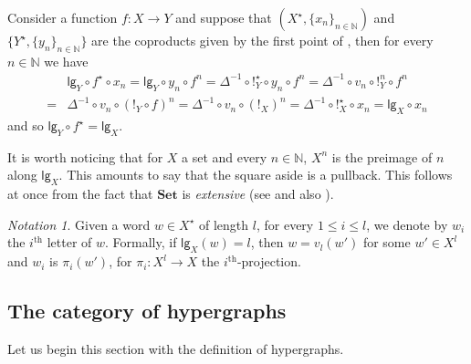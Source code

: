 \documentclass[3p]{elsarticle}
\newcommand{\lgh}{\mathsf{lg}}
\newcommand{\Set}{\mathbf{Set}}
\theoremstyle{remark}
\newtheorem*{notaz}{Notation}
\theoremstyle{definition}
\begin{document}
\begin{rem}\label{rem:le} Consider a function $f\colon X\to Y$  and suppose that $(X^\star, \{x_n\}_{n\in \mathbb{N}})$ and $\{Y^\star, \{y_n\}_{n\in \mathbb{N}}\}$ are the coproducts given by the first point of , then for every $n\in \mathbb{N}$ we have 
	\begin{align*}
&\lgh_{Y}\circ f^\star \circ x_n = \lgh_{Y}\circ y_n \circ f^n= \Delta^{-1}\circ !^\star_{Y} \circ y_n\circ f^n =  \Delta^{-1}\circ v_n \circ !^n_{Y} \circ f^n \\=& \Delta^{-1}\circ v_n \circ (!_{Y} \circ f)^n  = \Delta^{-1}\circ v_n \circ (!_{X})^n = \Delta^{-1}\circ !^\star_{X} \circ x_n = \lgh_{X}\circ x_n
	\end{align*}
and so $\lgh_{Y}\circ f^\star= \lgh_{X}$.
\end{rem}

\noindent
\begin{minipage}[r]{.83\linewidth}
	\begin{rem}\label{rem:len} It is worth noticing that for $X$ a set and every $n\in \mathbb{N}$, $X^n$ is the preimage of $n$ along $\lgh_{X}$. This amounts to say that the square aside is a pullback. This follows at once from the fact that $\Set$ is \emph{extensive} (see \cite{carboni1993introduction} and also ). 
	\end{rem}
\end{minipage}\hfill \begin{minipage}[l]{.15\linewidth} \vspace{-.2cm}
\xymatrix@R=13pt{X^n \ar@{>->}[r]^{v_n} \ar[d]^{!_{X^n}}& X^\star  \ar[d]^{\lgh_{X}}\\ 1 \ar@{>->}[r]^{\delta_n} & \mathbb{N}}
\end{minipage}

\begin{notaz}
	Given a word $w\in X^\star$ of length $l$, for every $1\leq i \leq l$, we denote by $w_i$ the $i^\mathrm{th}$ letter of $w$.  Formally, if $\lgh_X(w)=l$, then $w=v_l(w')$ for some $w'\in X^l$ and $w_i$ is $\pi_i(w')$, for $\pi_i\colon X^l\to X$ the $i^\mathrm{th}$-projection.
\end{notaz}

\subsection{The category of hypergraphs}\label{sub:hyp}

Let us begin this section with the definition of hypergraphs.
\end{document}
